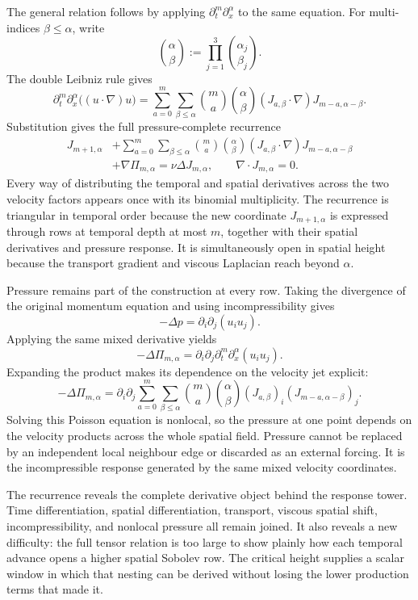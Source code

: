The general relation follows by applying \(\partial_t^m\partial_x^\alpha\) to the same equation.
For multi-indices \(\beta\leq\alpha\), write
\[
  \binom{\alpha}{\beta}
  :=
  \prod_{j=1}^{3}\binom{\alpha_j}{\beta_j}.
\]
The double Leibniz rule gives
\[
  \partial_t^m\partial_x^\alpha\bigl((u\cdot\nabla)u\bigr)
  =
  \sum_{a=0}^{m}
  \sum_{\beta\leq\alpha}
  \binom{m}{a}
  \binom{\alpha}{\beta}
  (J_{a,\beta}\cdot\nabla)
  J_{m-a,\alpha-\beta}.
\]
Substitution gives the full pressure-complete recurrence
\begin{align*}
  J_{m+1,\alpha}
  &+
  \sum_{a=0}^{m}
  \sum_{\beta\leq\alpha}
  \binom{m}{a}
  \binom{\alpha}{\beta}
  (J_{a,\beta}\cdot\nabla)
  J_{m-a,\alpha-\beta}
  \\
  &+
  \nabla\Pi_{m,\alpha}
  =
  \nu\Delta J_{m,\alpha},
  \qquad
  \nabla\cdot J_{m,\alpha}=0.
\end{align*}
Every way of distributing the temporal and spatial derivatives across the two velocity factors appears once with its binomial multiplicity.
The recurrence is triangular in temporal order because the new coordinate \(J_{m+1,\alpha}\) is expressed through rows at temporal depth at most \(m\), together with their spatial derivatives and pressure response.
It is simultaneously open in spatial height because the transport gradient and viscous Laplacian reach beyond \(\alpha\).

Pressure remains part of the construction at every row.
Taking the divergence of the original momentum equation and using incompressibility gives
\[
  -\Delta p
  =
  \partial_i\partial_j(u_i u_j).
\]
Applying the same mixed derivative yields
\[
  -\Delta\Pi_{m,\alpha}
  =
  \partial_i\partial_j
  \partial_t^m\partial_x^\alpha(u_i u_j).
\]
Expanding the product makes its dependence on the velocity jet explicit:
\[
  -\Delta\Pi_{m,\alpha}
  =
  \partial_i\partial_j
  \sum_{a=0}^{m}
  \sum_{\beta\leq\alpha}
  \binom{m}{a}
  \binom{\alpha}{\beta}
  (J_{a,\beta})_i
  (J_{m-a,\alpha-\beta})_j.
\]
Solving this Poisson equation is nonlocal, so the pressure at one point depends on the velocity products across the whole spatial field.
Pressure cannot be replaced by an independent local neighbour edge or discarded as an external forcing.
It is the incompressible response generated by the same mixed velocity coordinates.

The recurrence reveals the complete derivative object behind the response tower.
Time differentiation, spatial differentiation, transport, viscous spatial shift, incompressibility, and nonlocal pressure all remain joined.
It also reveals a new difficulty: the full tensor relation is too large to show plainly how each temporal advance opens a higher spatial Sobolev row.
The critical height supplies a scalar window in which that nesting can be derived without losing the lower production terms that made it.
